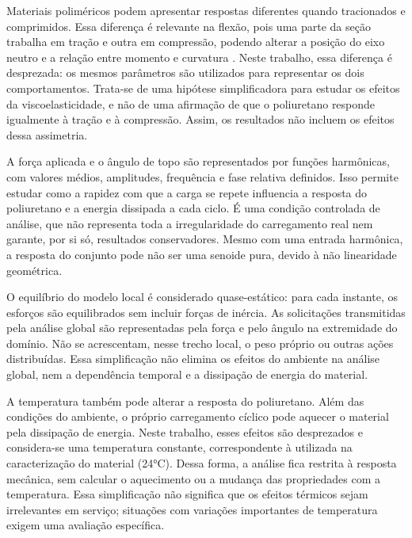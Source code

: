 \documentclass[arial,centeredequations,english,brazilian,oneside,section=TITLE]{ifes8}
\begin{document}
Materiais poliméricos podem apresentar respostas diferentes quando tracionados e comprimidos.
Essa diferença é relevante na flexão, pois uma parte da seção trabalha em tração e outra em
compressão, podendo alterar a posição do eixo neutro e a relação entre momento e curvatura
\cite{Caire2011}. Neste trabalho, essa diferença é desprezada: os mesmos parâmetros
são utilizados para representar os dois comportamentos. Trata-se de uma hipótese simplificadora
para estudar os efeitos da viscoelasticidade, e não de uma afirmação de que o poliuretano
responde igualmente à tração e à compressão. Assim, os resultados não incluem os efeitos
dessa assimetria.

A força aplicada e o ângulo de topo são representados por funções harmônicas, com valores
médios, amplitudes, frequência e fase relativa definidos. Isso permite estudar como a rapidez
com que a carga se repete influencia a resposta do poliuretano e a energia dissipada a cada
ciclo. É uma condição controlada de análise, que não representa toda a irregularidade do
carregamento real nem garante, por si só, resultados conservadores. Mesmo com uma entrada
harmônica, a resposta do conjunto pode não ser uma senoide pura, devido à não linearidade
geométrica.

O equilíbrio do modelo local é considerado quase-estático: para cada instante, os
esforços são equilibrados sem incluir forças de inércia. As solicitações transmitidas
pela análise global são representadas pela força e pelo ângulo na extremidade do
domínio. Não se acrescentam, nesse trecho local, o peso próprio ou outras ações
distribuídas. Essa simplificação não elimina os efeitos do ambiente na análise global,
nem a dependência temporal e a dissipação de energia do material.

A temperatura também pode alterar a resposta do poliuretano. Além das condições do ambiente,
o próprio carregamento cíclico pode aquecer o material pela dissipação de energia. Neste
trabalho, esses efeitos são desprezados e considera-se uma temperatura constante, correspondente
à utilizada na caracterização do material (24°C). Dessa forma, a análise fica restrita à resposta
mecânica, sem calcular o aquecimento ou a mudança das propriedades com a temperatura.
Essa simplificação não significa que os efeitos térmicos sejam irrelevantes em serviço;
situações com variações importantes de temperatura exigem uma avaliação específica.
\end{document}
